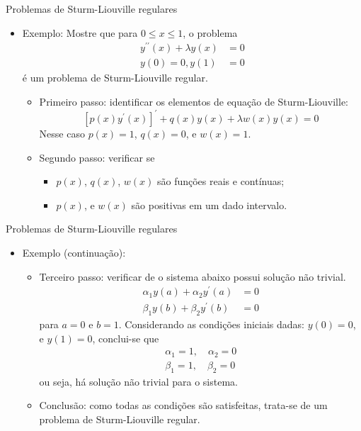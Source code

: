       \begin{slide}[toc=]{Problemas de Sturm-Liouville regulares}
	      \begin{itemize}
		      \item Exemplo: Mostre que para $0\leq x \leq 1$, o problema
			      \begin{align*}
				      y^{\prime\prime}(x) + \lambda y(x) &= 0\\
				      y(0) = 0, y(1) &= 0
			      \end{align*}
			      é um problema de Sturm-Liouville regular.
			      \begin{itemize}
				      \item Primeiro passo: identificar os elementos de equação de Sturm-Liouville:
					      \begin{equation*}
						      \left [ p(x)y^\prime (x)\right ]^\prime + q(x)y(x) + \lambda w(x)y(x) = 0
					      \end{equation*}
			      Nesse caso $p(x) = 1$, $q(x) = 0$, e $w(x) = 1$.\\
		      		      \item Segundo passo: verificar se
					      \begin{itemize}
						      \item $p(x)$, $q(x)$, $w(x)$ são funções reais e contínuas;
						      \item $p(x)$, e $w(x)$ são positivas em um dado intervalo.
					      \end{itemize}
			      \end{itemize}
	      \end{itemize}
      \end{slide}

      \begin{slide}[toc=]{Problemas de Sturm-Liouville regulares}
	      \begin{itemize}
		      \item Exemplo (continuação):
			      \begin{itemize}
				      \item Terceiro passo: verificar de o sistema abaixo possui solução não trivial.
					      \begin{align*}
						      \alpha_1y(a) + \alpha_2 y^\prime (a) &= 0\\
						      \beta_1 y(b) + \beta_2 y^\prime (b) &= 0
					      \end{align*}
					      para $a=0$ e $b= 1$. 
					      Considerando as condições iniciais dadas: $y(0) = 0$, e $ y(1) = 0$, conclui-se que 
					      \begin{align*}
						      \alpha_1 = 1, \quad \alpha_2 = 0\\
						      \beta_1 = 1, \quad \beta_2 = 0
					      \end{align*}
					      ou seja, há solução não trivial para o sistema.
				      \item Conclusão: como todas as condições são satisfeitas, trata-se de um problema de Sturm-Liouville regular.
			      \end{itemize}
	      \end{itemize}
      \end{slide}
   
